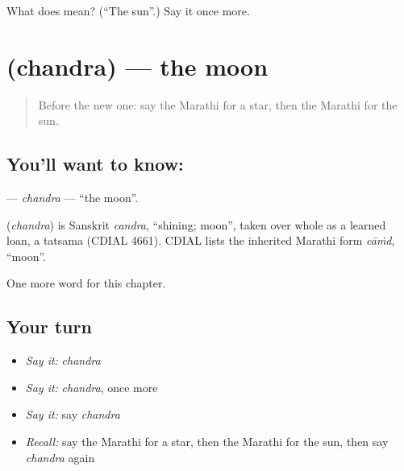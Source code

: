 \begin{tcolorbox}[breakable,colback=teal!4,colframe=teal!35!black,title={Before you move on}]
What does  mean? (\textquotedblleft{}The sun\textquotedblright{}.) Say it once more.
\end{tcolorbox}
\section[\texorpdfstring{\mr{चंद्र} (chandra)}{चंद्र (chandra)}]{ (chandra) — the moon}

\label{lesson:MR-C98-chandra}



\begin{quote}
Before the new one: say the Marathi for a star, then the Marathi for the sun.
\end{quote}

\subsection*{You'll want to know: }
\textbf{} — \emph{chandra} — \textquotedblleft{}the moon\textquotedblright{}.

\begin{cousinweb}
\textbf{} (\emph{chandra}) is Sanskrit \emph{candra}, \textquotedblleft{}shining; moon\textquotedblright{}, taken over whole as a learned loan, a tatsama (CDIAL 4661). CDIAL lists the inherited Marathi form \emph{cāṁd}, \textquotedblleft{}moon\textquotedblright{}.
\end{cousinweb}

\begin{grammarlens}[title={What you've built}]
One more word for this chapter.
\end{grammarlens}

\subsection*{Your turn}
\begin{itemize}
\raggedright
  \item \emph{Say it:} \emph{chandra}
  \item \emph{Say it:} \emph{chandra}, once more
  \item \emph{Say it:} say \emph{chandra}
  \item \emph{Recall:} say the Marathi for a star, then the Marathi for the sun, then say \emph{chandra} again
\end{itemize}

